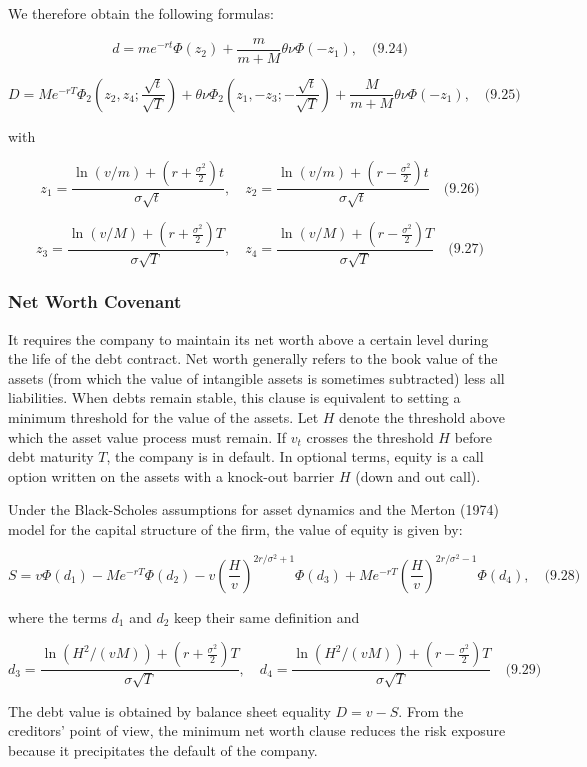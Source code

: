 \documentclass[12pt,a4paper]{article}
\begin{document}
We therefore obtain the following formulas:

$$d = me^{-rt}\Phi(z_2) + \frac{m}{m+M} \theta \nu \Phi(-z_1), \quad \text{(9.24)}$$

$$D = Me^{-rT}\Phi_2\left(z_2, z_4; \frac{\sqrt{t}}{\sqrt{T}}\right) + \theta \nu \Phi_2\left(z_1, -z_3; -\frac{\sqrt{t}}{\sqrt{T}}\right) + \frac{M}{m+M} \theta \nu \Phi(-z_1), \quad \text{(9.25)}$$

with

$$z_1 = \frac{\ln(v/m) + (r + \frac{\sigma^2}{2})t}{\sigma\sqrt{t}}, \quad z_2 = \frac{\ln(v/m) + (r - \frac{\sigma^2}{2})t}{\sigma\sqrt{t}} \quad \text{(9.26)}$$

$$z_3 = \frac{\ln(v/M) + (r + \frac{\sigma^2}{2})T}{\sigma\sqrt{T}}, \quad z_4 = \frac{\ln(v/M) + (r - \frac{\sigma^2}{2})T}{\sigma\sqrt{T}} \quad \text{(9.27)}$$

\subsubsection{Net Worth Covenant}

It requires the company to maintain its net worth above a certain level during the life of the debt contract. Net worth generally refers to the book value of the assets (from which the value of intangible assets is sometimes subtracted) less all liabilities. When debts remain stable, this clause is equivalent to setting a minimum threshold for the value of the assets. 
Let $H$ denote the threshold above which the asset value process must remain. If $v_t$ crosses the threshold $H$ before debt maturity $T$, the company is in default. In optional terms, equity is a call option written on the assets with a knock-out barrier $H$ (down and out call).

Under the Black-Scholes assumptions for asset dynamics and the Merton (1974) model for the capital structure of the firm, the value of equity is given by:

$$S = v\Phi(d_1) - Me^{-rT}\Phi(d_2) - v\left(\frac{H}{v}\right)^{2r/\sigma^2 + 1}\Phi(d_3) + Me^{-rT}\left(\frac{H}{v}\right)^{2r/\sigma^2 - 1}\Phi(d_4), \quad \text{(9.28)}$$

where the terms $d_1$ and $d_2$ keep their same definition and

$$d_3 = \frac{\ln(H^2/(vM)) + (r + \frac{\sigma^2}{2})T}{\sigma\sqrt{T}}, \quad d_4 = \frac{\ln(H^2/(vM)) + (r - \frac{\sigma^2}{2})T}{\sigma\sqrt{T}} \quad \text{(9.29)}$$

The debt value is obtained by balance sheet equality $D = v - S$. From the creditors' point of view, the minimum net worth clause reduces the risk exposure because it precipitates the default of the company.
\end{document}

